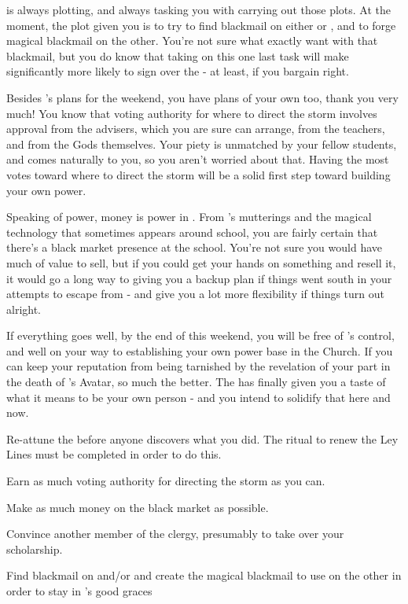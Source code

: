 \documentclass[char]{GL2020}
\begin{document}
\cAntiChup{} is always plotting, and always tasking you with carrying out those plots. At the moment, the plot \cAntiChup{\they} \cAntiChup{\have} given you is to try to find blackmail on either \cInitiate{} or \cPirate{}, and to forge magical blackmail on the other. You’re not sure what exactly \cAntiChup{\they} want\cAntiChup{\plural} with that blackmail, but you do know that taking on this one last task will make \cAntiChup{} significantly more likely to sign over the \iScholarship{} - at least, if you bargain right.

Besides \cAntiChup{}’s plans for the weekend, you have plans of your own too, thank you very much! You know that voting authority for where to direct the storm involves approval from the advisers, which you are sure \cAntiChup{} can arrange, from the teachers, and from the Gods themselves. Your piety is unmatched by your fellow students, and comes naturally to you, so you aren’t worried about that. Having the most votes toward where to direct the storm will be a solid first step toward building your own power.

Speaking of power, money is power in \pTech{}. From \cAntiChup{}’s mutterings and the magical technology that sometimes appears around school, you are fairly certain that there’s a black market presence at the school. You’re not sure you would have much of value to sell, but if you could get your hands on something and resell it, it would go a long way to giving you a backup plan if things went south in your attempts to escape from \cAntiChup{} - and give you a lot more flexibility if things turn out alright.

If everything goes well, by the end of this weekend, you will be free of \cAntiChup{}’s control, and well on your way to establishing your own power base in the Church. If you can keep your reputation from being tarnished by the revelation of your part in the death of \cEbb{}’s Avatar, so much the better. The \pSchool{} has finally given you a taste of what it means to be your own person - and you intend to solidify that here and now.

\begin{itemz}[Goals]
	\item Re-attune the \iNet{} before anyone discovers what you did. The ritual to renew the Ley Lines must be completed in order to do this.
	\item Earn as much voting authority for directing the storm as you can.
	\item Make as much money on the black market as possible.
	\item Convince another member of the \pTech{} clergy, presumably \cBeetle{} to take over your scholarship.
	\item Find blackmail on \cInitiate{} and/or \cPirate{} and create the magical blackmail to use on the other in order to stay in \cAntiChup{}’s good graces
\end{itemz}
\end{document}

